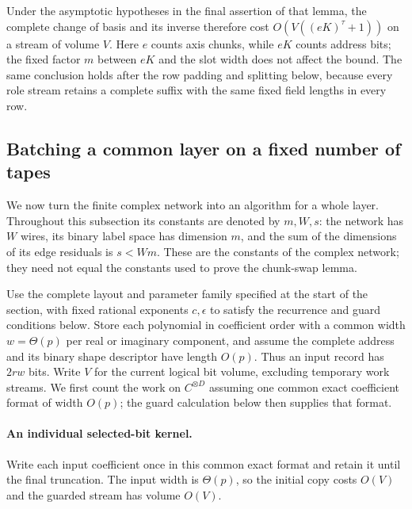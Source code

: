 \documentclass[11pt]{article}
\theoremstyle{definition}
\begin{document}
Under the asymptotic hypotheses in the final assertion of that lemma,
the complete change of basis and its inverse therefore cost
$O(V((eK)^\tau+1))$ on a stream of volume $V$.  Here $e$ counts
axis chunks, while $eK$ counts address bits; the fixed factor $m$
between $eK$ and the slot width does not affect the bound.  The same
conclusion holds after the row padding and splitting below, because
every role stream retains a complete suffix with the same fixed field
lengths in every row.

\subsection{Batching a common layer on a fixed number of tapes}

We now turn the finite complex network into an algorithm for a whole
layer.  Throughout this subsection its constants are denoted by
\(m,W,s\): the network has \(W\) wires, its binary label space has
dimension \(m\), and the sum of the dimensions of its edge residuals is
\(s<Wm\).  These are the constants of the complex network; they need not
equal the constants used to prove the chunk-swap lemma.

Use the complete layout and parameter family specified at the start of
the section, with fixed rational exponents \(c,\epsilon\) to satisfy
the recurrence and guard conditions below. Store each polynomial in
coefficient order with a common width \(w=\Theta(p)\) per real or
imaginary component, and assume the complete address and its binary
shape descriptor have length \(O(p)\). Thus an input record has
\(2rw\) bits. Write \(V\) for the current logical bit volume, excluding
temporary work streams. We first count the work on \(C^{\otimes D}\)
assuming one common exact coefficient format of width \(O(p)\); the
guard calculation below then supplies that format.

\paragraph{An individual selected-bit kernel.}
Write each input coefficient once in this common exact format and retain it until
the final truncation.  The input width is \(\Theta(p)\), so the
initial copy costs \(O(V)\) and the guarded stream has volume \(O(V)\).
\end{document}
